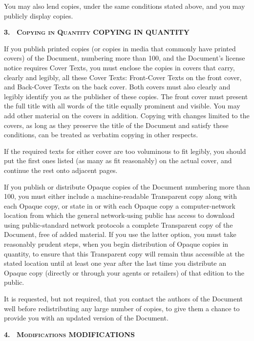 You may also lend copies, under the same conditions stated
above, and you may publicly display copies.

\medskip
\begin{center}
  \textbf{%
    \Large
    3.\
    \ifgfdl@sc
      \textsc{Copying in Quantity}%
    \else
      COPYING IN QUANTITY%
    \fi
  }%
\end{center}

\noindent
If you publish printed copies (or copies in media that
commonly have printed covers) of the Document, numbering
more than 100, and the Document's license notice requires
Cover Texts, you must enclose the copies in covers that
carry, clearly and legibly, all these Cover Texts:
Front-Cover Texts on the front cover, and Back-Cover Texts
on the back cover. Both covers must also clearly and legibly
identify you as the publisher of these copies. The front
cover must present the full title with all words of the
title equally prominent and visible. You may add other
material on the covers in addition. Copying with changes
limited to the covers, as long as they preserve the title of
the Document and satisfy these conditions, can be treated as
verbatim copying in other respects.

If the required texts for either cover are too voluminous
to fit legibly, you should put the first ones listed (as
many as fit reasonably) on the actual cover, and continue
the rest onto adjacent pages.

If you publish or distribute Opaque copies of the Document
numbering more than 100, you must either include a
machine-readable Transparent copy along with each Opaque
copy, or state in or with each Opaque copy a
computer-network location from which the general
network-using public has access to download using
public-standard network protocols a complete Transparent
copy of the Document, free of added material. If you use
the latter option, you must take reasonably prudent steps,
when you begin distribution of Opaque copies in quantity,
to ensure that this Transparent copy will remain thus
accessible at the stated location until at least one year
after the last time you distribute an Opaque copy
(directly or through your agents or retailers) of that
edition to the public.

It is requested, but not required, that you contact the
authors of the Document well before redistributing any
large number of copies, to give them a chance to provide
you with an updated version of the Document.

\medskip
\begin{center}
  \textbf{%
    \Large 4.\
    \ifgfdl@sc
      \textsc{Modifications}%
    \else
      MODIFICATIONS%
    \fi
  }
\end{center}


